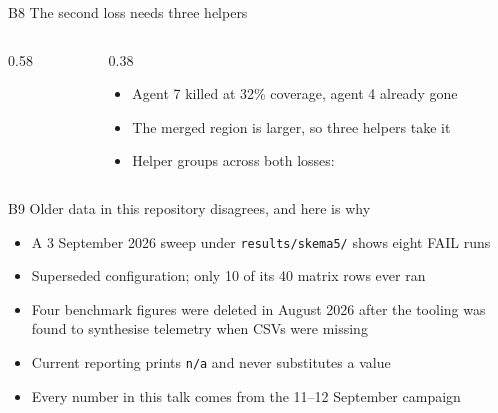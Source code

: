 \documentclass[aspectratio=169,11pt,t]{beamer}
\begin{document}
\begin{frame}{B8 \textperiodcentered{} The second loss needs three helpers}
  \begin{columns}[T,onlytextwidth]
    \begin{column}{0.58\textwidth}
    \end{column}
    \begin{column}{0.38\textwidth}
      \vskip2mm
      \begin{itemize}\bulletgap\small
        \item Agent 7 killed at 32\% coverage, agent 4 already gone
        \item The merged region is larger, so three helpers take it
        \item Helper groups across both losses: \HelpersRectHinf
      \end{itemize}
    \end{column}
  \end{columns}
\end{frame}

\begin{frame}{B9 \textperiodcentered{} Older data in this repository disagrees, and here is why}
  \begin{itemize}\bulletgap
    \item A 3 September 2026 sweep under \texttt{results/skema5/} shows eight FAIL runs
    \item Superseded configuration; only 10 of its 40 matrix rows ever ran
    \item Four benchmark figures were deleted in August 2026 after the tooling
          was found to synthesise telemetry when CSVs were missing
    \item Current reporting prints \texttt{n/a} and never substitutes a value
    \item Every number in this talk comes from the 11--12 September campaign
  \end{itemize}
\end{frame}
\end{document}
